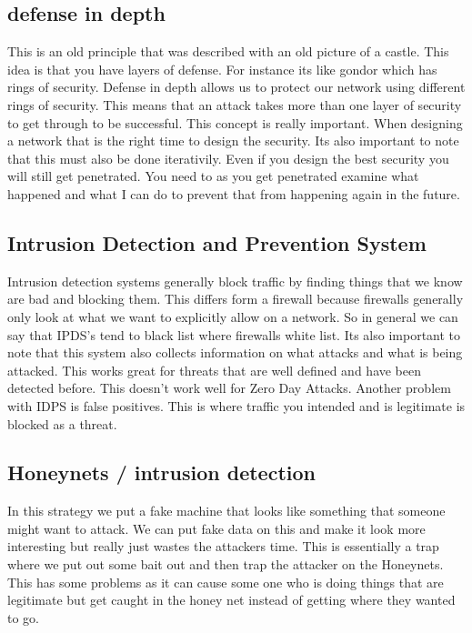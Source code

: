 \documentclass[letterpaper, onecolumn,10pt]{IEEEtran}
\begin{document}
			     \subsection{defense in depth}
			     This is an old principle that was described with an old picture of a castle. This idea is that you have layers of defense. For instance its like gondor which has rings of security. Defense in depth allows us to protect our network using different rings of security. This means that an attack takes more than one layer of security to get through to be successful. This concept is really important. When designing a network that is the right time to design the security. Its also important to note that this must also be done iterativily. Even if you design the best security you will still get penetrated. You need to as you get penetrated examine what happened and what I can do to prevent that from happening again in the future. \\
			     
			     \subsection{Intrusion Detection and Prevention System}
			     Intrusion detection systems generally block traffic by finding things that we know are bad and blocking them. This differs form a firewall because firewalls generally only look at what we want to explicitly allow on a network. So in general we can say that IPDS's tend to black list where firewalls white list. Its also important to note that this system also collects information on what attacks and what is being attacked. This works great for threats that are well defined and have been detected before. This doesn't work well for Zero Day Attacks. Another problem with IDPS is false positives. This is where traffic you intended and is legitimate is blocked as a threat.\\
			     
			    \subsection{ Honeynets / intrusion detection }
			    In this strategy we put a fake machine that looks like something that someone might want to attack. We can put fake data on this and make it look more interesting but really just wastes the attackers time. This is essentially a trap where we put out some bait out and then trap the attacker on the Honeynets. This has some problems as it can cause some one who is doing things that are legitimate but get caught in the honey net instead of getting where they wanted to go.\\
			    
\end{document}
